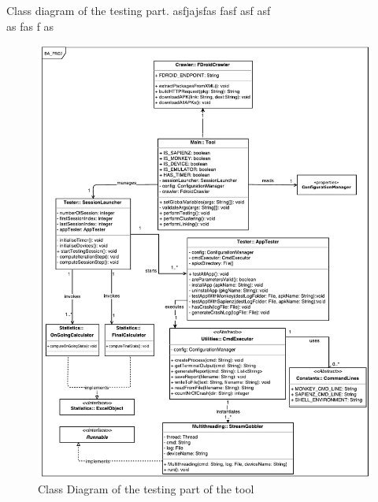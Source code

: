 
Class diagram of the testing part. 
asfjajsfas
fasf
asf
asf\\
as
fas
f
as
\begin{figure}[t]
\centering 
\includegraphics[width=\columnwidth]{diagrams/TesterClassDiagram.pdf} 
\caption{Class Diagram of the testing part of the tool }
\label{testerDiagram}
\vspace{-3mm} 
\end{figure}


